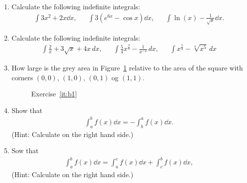 \begin{enumerate}
	\item Calculate the following indefinite integrals:
	\begin{align*}
	\int 3x^2+2x\dd x,&& \int 3(e^{6x}-\cos x) \dd x,&& \int \ln(x)-\frac{1}{\sqrt{x}} \dd x.
	\end{align*}
	

	
	\item Calculate the following indefinite integrals:
	\begin{align*}
	\int \frac{2}{x}+3\sqrt{x}+4x \, d x,&& \int \frac{5}{4} x^{\frac{3}{8}}-\frac{1}{x^{-2}} \, d x,&& \int x^{\frac{5}{4}}-\sqrt[4]{x^5}\, d x
	\end{align*}
	
	
	\item \label{it:b1} How large is the grey area in Figure~\ref{fig:b1} relative to the area of the square with corners $(0,0)$, $(1,0)$, $(0,1)$ og $(1,1)$.
	\begin{figure}
		\centering
		\caption{Exercise~\ref{it:b1}}
		\label{fig:b1}
	\end{figure}
	
	\item \label{it:bes3} Show that
	\begin{align*}
	\int_{a}^{b} f(x)\dd x=-\int_{b}^{a} f(x) \dd x.
	\end{align*}
	(Hint: Calculate on the right hand side.)
	
	\item \label{it:best2} Sow that
	\begin{align*}
	\int_a^b f(x)\dd x=\int_a^c f(x)\dd x+\int_c^b f(x)\dd x,
	\end{align*}
	(Hint: Calculate on the right hand side.)
	
	
\end{enumerate}